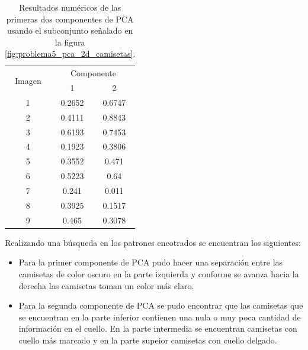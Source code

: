 \begin{table}[H]
    \centering
    \begin{tabular}{ccc} \hline
        \multirow{2}{*}{Imagen} & \multicolumn{2}{c}{Componente}          \\
                                & 1                              & 2      \\ \hline
        1                       & 0.2652                         & 0.6747 \\
        2                       & 0.4111                         & 0.8843 \\
        3                       & 0.6193                         & 0.7453 \\
        4                       & 0.1923                         & 0.3806 \\
        5                       & 0.3552                         & 0.471  \\
        6                       & 0.5223                         & 0.64   \\
        7                       & 0.241                          & 0.011  \\
        8                       & 0.3925                         & 0.1517 \\
        9                       & 0.465                          & 0.3078 \\ \hline
    \end{tabular}
    \caption{Resultados numéricos de las primeras dos componentes de PCA usando el subconjunto señalado en la figura \ref{fig:problema5_pca_2d_camisetas}.}
    \label{table:pca_2d}
\end{table}

Realizando una búsqueda en los patrones encotrados se encuentran los siguientes:

\begin{itemize}
    \item Para la primer componente de PCA pudo hacer una separación entre las camisetas de color oscuro en la parte izquierda y conforme se avanza hacia la derecha las camisetas toman un color más claro.
    \item Para la segunda componente de PCA se pudo encontrar que las camisetas que se encuentran en la parte inferior contienen una nula o muy poca cantidad de información en el cuello. En la parte intermedia se encuentran camisetas con cuello más marcado y en la parte supeior camisetas con cuello delgado.
\end{itemize}

